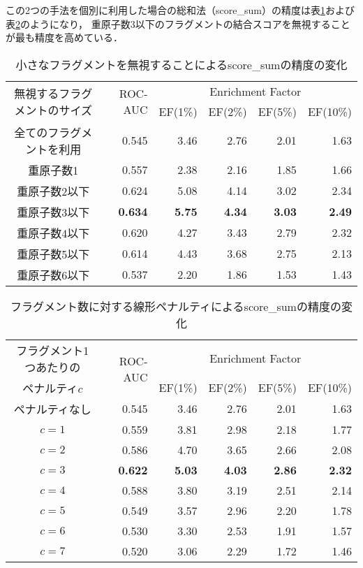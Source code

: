 この2つの手法を個別に利用した場合の総和法（score\_sum）の精度は表\ref{table:omit}および表\ref{table:penalty}のようになり，
重原子数3以下のフラグメントの結合スコアを無視することが最も精度を高めている．

\begin{table}[h] \centering
	\caption{小さなフラグメントを無視することによるscore\_sumの精度の変化}
	\label{table:omit}
	\begin{tabular}{c|rrrrr}
	\hline
	\multirow{2}{*}{無視するフラグメントのサイズ}	&\multirow{2}{*}{ROC-AUC}	&\multicolumn{4}{c}{Enrichment Factor}				\\
										&						&EF(1\%)		&EF(2\%)		&EF(5\%)		&EF(10\%)	\\ \hline
	全てのフラグメントを利用					&0.545					&3.46		&2.76		&2.01		&1.63		\\
	重原子数1							&0.557					&2.38		&2.16		&1.85		&1.66		\\
	重原子数2以下						&0.624					&5.08		&4.14		&3.02		&2.34		\\
	重原子数3以下						&{\bf 0.634}				&{\bf 5.75}	&{\bf 4.34}	&{\bf 3.03}	&{\bf 2.49}	\\
	重原子数4以下						&0.620					&4.27		&3.43		&2.79		&2.32		\\
	重原子数5以下						&0.614					&4.43		&3.68		&2.75		&2.13		\\
	重原子数6以下						&0.537					&2.20		&1.86		&1.53		&1.43		\\ \hline
	\end{tabular}
\end{table}
\begin{table}[h] \centering
	\caption{フラグメント数に対する線形ペナルティによるscore\_sumの精度の変化}
	\label{table:penalty}
	\begin{tabular}{c|rrrrr}
	\hline
	フラグメント1つあたりの	&\multirow{2}{*}{ROC-AUC}	&\multicolumn{4}{c}{Enrichment Factor}				\\
	ペナルティ$c$			&						&EF(1\%)		&EF(2\%)		&EF(5\%)		&EF(10\%)	\\ \hline
	ペナルティなし			&0.545					&3.46		&2.76		&2.01		&1.63		\\
	$c=1$				&0.559					&3.81		&2.98		&2.18		&1.77		\\
	$c=2$				&0.586					&4.70		&3.65		&2.66		&2.08		\\
	$c=3$				&{\bf 0.622}				&{\bf 5.03}	&{\bf 4.03}	&{\bf 2.86}	&{\bf 2.32}	\\
	$c=4$				&0.588					&3.80		&3.19		&2.51		&2.14		\\
	$c=5$				&0.549					&3.57		&2.96		&2.20		&1.78		\\
	$c=6$				&0.530					&3.30		&2.53		&1.91		&1.57		\\
	$c=7$				&0.520					&3.06		&2.29		&1.72		&1.46		\\ \hline
	\end{tabular}
\end{table}

